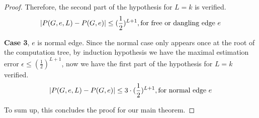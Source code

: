 \begin{proof}
		Therefore, the second part of the hypothesis for $L=k$ is verified.
		\[\left\vert P(G,e,L) - P(G,e)\right\vert \leq (\frac{1}{2})^{L+1}, \textrm{for free or dangling edge $e$}\]

		{\bf Case 3}, $e$ is normal edge. Since the normal case only appears once at the root of the computation tree,
		by induction hypothesis we have the maximal estimation error $\epsilon \leq (\frac{1}{2})^{L+1}$,
		now we have the first part of the hypothesis for $L=k$ verified.
		\[\left\vert P(G,e,L) - P(G,e)\right\vert \leq 3\cdot(\frac{1}{2})^{L+1}, \textrm{for normal edge $e$}\]
		
		To sum up, this concludes the proof for our main theorem.
	\end{proof}
